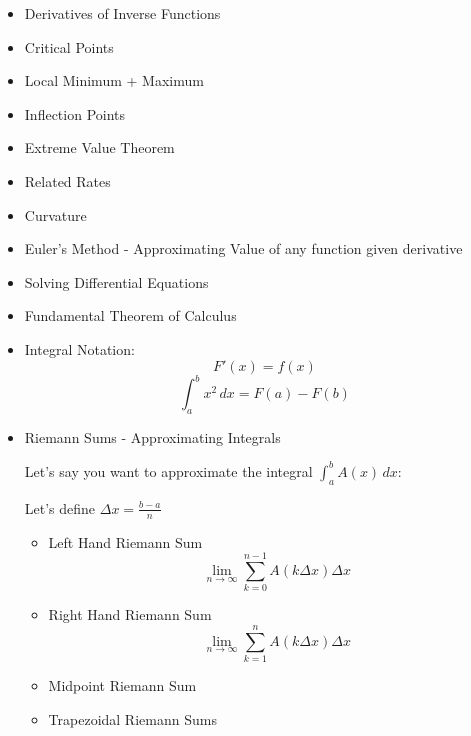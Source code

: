 \documentclass{article}
\begin{document}
\begin{itemize}

\item Derivatives of Inverse Functions 

\item Critical Points

\item Local Minimum + Maximum

\item Inflection Points

\item Extreme Value Theorem 

\item Related Rates

\item Curvature 

\item Euler's Method - Approximating Value of any function given derivative

\item Solving Differential Equations 

\item Fundamental Theorem of Calculus 

\item Integral Notation: 
$$ F'(x) = f(x) $$
$$ \int_{a}^{b} x^2 \,dx = F(a) - F(b) $$

\item Riemann Sums - Approximating Integrals

Let's say you want to approximate the integral $\int_{a}^{b} A(x) \,dx$: 

Let's define $\Delta x = \frac{b - a}{n}$

    \begin{itemize}
    \item Left Hand Riemann Sum
$$
\lim_{n\to\infty} \sum_{k=0} ^{n-1} A(k\Delta x)\Delta x 
$$
    \item Right Hand Riemann Sum 
$$
\lim_{n\to\infty} \sum_{k=1} ^{n} A(k\Delta x)\Delta x 
$$

    \item Midpoint Riemann Sum 
    \item Trapezoidal Riemann Sums
  \end{itemize}
  


\end{itemize}
\end{document}
